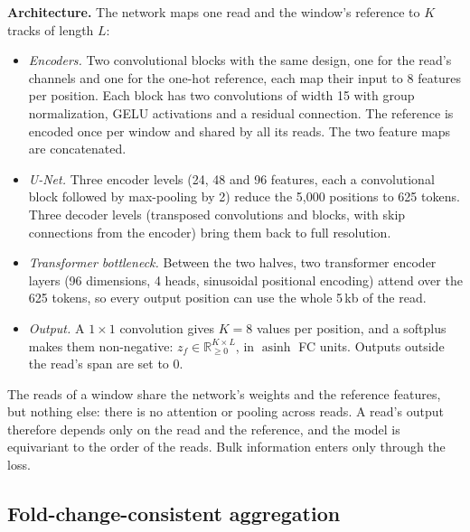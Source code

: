 \documentclass[acmtog,nonacm]{acmart}   %
\begin{document}
\textbf{Architecture.} The network maps one read and the window's reference to $K$ tracks of length $L$:
\begin{itemize}
  \item \emph{Encoders.} Two convolutional blocks with the same design, one for the read's channels and one for
    the one-hot reference, each map their input to 8 features per position. Each block has two convolutions of
    width 15 with group normalization, GELU activations and a residual connection. The reference is encoded once
    per window and shared by all its reads. The two feature maps are concatenated.
  \item \emph{U-Net.} Three encoder levels (24, 48 and 96 features, each a convolutional block followed by
    max-pooling by 2) reduce the 5,000 positions to 625 tokens. Three decoder levels (transposed convolutions and
    blocks, with skip connections from the encoder) bring them back to full resolution.
  \item \emph{Transformer bottleneck.} Between the two halves, two transformer encoder layers (96 dimensions,
    4 heads, sinusoidal positional encoding) attend over the 625 tokens, so every output position can use the
    whole 5\,kb of the read.
  \item \emph{Output.} A $1\times1$ convolution gives $K=8$ values per position, and a softplus makes them
    non-negative: $z_f\in\mathbb{R}_{\ge0}^{K\times L}$, in $\operatorname{asinh}$ FC units. Outputs outside the
    read's span are set to 0.
\end{itemize}
The reads of a window share the network's weights and the reference features, but nothing else: there is no
attention or pooling across reads. A read's output therefore depends only on the read and the reference, and the
model is equivariant to the order of the reads. Bulk information enters only through the loss.

\subsection{Fold-change-consistent aggregation}
\label{sec:aggregation}
\end{document}
